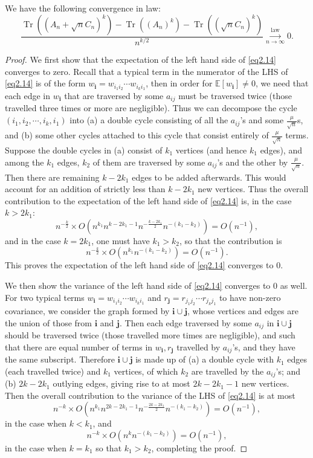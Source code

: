 \documentclass[10pt,a4paper]{amsart}
\begin{document}
\begin{lemma}\label{fuckgreat}
    We have the following convergence in law:
\begin{equation}\label{eq2.14}
   \frac{\operatorname{Tr}((A_n+\sqrt{n}C_n)^k)-\operatorname{Tr}((A_n)^k)-\operatorname{Tr}((\sqrt{n}C_n)^k)}{n^{k/2}}\overset{\text{law}}{\underset{n\to\infty}\longrightarrow}0.
\end{equation}
\end{lemma}

\begin{proof} We first show that the expectation of the left hand side of \eqref{eq2.14} converges to zero. Recall that a typical term in the numerator of the LHS of \eqref{eq2.14} is of the form $w_{\mathbf{i}}=w_{i_1i_2}\cdots w_{i_ki_1}$, then in order for $\mathbb{E}[w_\mathbf{i}]\neq 0$, we need that each edge in $w_\mathbf{i}$ that are traversed by some $a_{ij}$ must be traversed twice (those travelled three times or more are negligible). Thus we can decompose the cycle $(i_1,i_2,\cdots,i_{k},i_1)$ into (a) a double cycle consisting of all the $a_{ij}$'s and some $\frac{\mu}{\sqrt{n}}$s, and (b) some other cycles attached to this cycle that consist entirely of $\frac{\mu}{\sqrt{n}}$ terms. Suppose the double cycles in (a) consist of $k_1$ vertices (and hence $k_1$ edges), and among the $k_1$ edges, $k_2$ of them are traversed by some $a_{ij}$'s and the other by $\frac{\mu}{\sqrt{n}}$.  Then there are remaining $k-2k_1$ edges to be added afterwards. This would account for an addition of strictly less than $k-2k_1$ new vertices. Thus the overall contribution to the expectation of the left hand side of \eqref{eq2.14} is, in the case $k>2k_1$: 
$$
n^{-\frac{k}{2}}\times O(n^{k_1}n^{k-2k_1-1}n^{-\frac{k-2k_1}{2}}n^{-(k_1-k_2)})=O(n^{-1}),
$$
and in the case $k=2k_1$, one must have $k_1>k_2$, so that the contribution is
$$
n^{-\frac{k}{2}}\times O(n^{k_1}n^{-(k_1-k_2)})=O(n^{-1}).
$$
This proves the expectation of the left hand side of \eqref{eq2.14} converges to $0$.

We then show the variance of the left hand side of \eqref{eq2.14} converges to $0$ as well. For two typical terms $w_{\mathbf{i}}=w_{i_1i_2}\cdots w_{i_ki_1}$ and $r_{\mathbf{j}}=r_{j_1j_2}\cdots r_{j_kj_1}$ to have non-zero covariance, we consider the graph formed by $\mathbf{i}\cup\mathbf{j}$, whose vertices and edges are the union of those from $\mathbf{i}$ and $\mathbf{j}$. Then each edge traversed by some $a_{ij}$ in $\mathbf{i}\cup\mathbf{j}$ should be traversed twice (those travelled more times are negligible), and such that there are equal number of terms in $w_\mathbf{i},r_\mathbf{j}$ travelled by $a_{ij}$'s, and they have the same subscript. Therefore $\mathbf{i}\cup\mathbf{j}$ is made up of (a) a double cycle with $k_1$ edges (each travelled twice) and $k_1$ vertices, of which $k_2$ are travelled by the $a_{ij}$'s; and (b) $2k-2k_1$ outlying edges, giving rise to at most $2k-2k_1-1$ new vertices. Then the overall contribution to the variance of the LHS of \eqref{eq2.14} is at most 
$$
n^{-k}\times O(n^{k_1}n^{2k-2k_1-1}n^{-\frac{2k-2k_1}{2}}n^{-(k_1-k_2)})=O(n^{-1}),
$$ in the case when $k<k_1$,
and 
$$
n^{-k}\times O(n^kn^{-(k_1-k_2)})=O(n^{-1}),$$
in the case when $k=k_1$ so that $k_1>k_2$,
completing the proof.
\end{proof}
\end{document}
